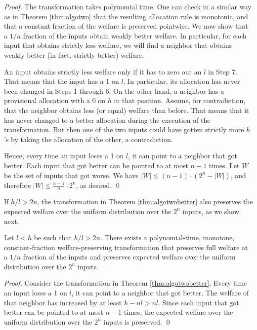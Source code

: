 \documentclass[runningheads,a4paper]{llncs}
\begin{document}
\begin{proof}
The transformation takes polynomial time. One can check in a similar way as in Theorem \ref{thm:algotwo} that the resulting allocation rule is monotonic, and that a constant fraction of the welfare is preserved pointwise. We now show that a $1/n$ fraction of the inputs obtain weakly better welfare. In particular, for each input that obtains strictly less welfare, we will find a neighbor that obtains weakly better (in fact, strictly better) welfare.

An input obtains strictly less welfare only if it has to zero out an $l$ in Step 7. That means that the input has a 1 on $l$. In particular, its allocation has never been changed in Steps 1 through 6. On the other hand, a neighbor has a provisional allocation with a 0 on $h$ in that position. Assume, for contradiction, that the neighbor obtains less (or equal) welfare than before. That means that it has never changed to a better allocation during the execution of the transformation. But then one of the two inputs could have gotten strictly more $h$'s by taking the allocation of the other, a contradiction.

Hence, every time an input loses a 1 on $l$, it can point to a neighbor that got better. Each input that got better can be pointed to at most $n-1$ times. Let $W$ be the set of inputs that got worse. We have $|W|\leq (n-1)\cdot(2^n-|W|)$, and therefore $|W|\leq\frac{n-1}{n}\cdot 2^n$, as desired. \qed
\end{proof}

If $h/l>2n$, the transformation in Theorem \ref{thm:algotwobetter} also preserves the expected welfare over the uniform distribution over the $2^n$ inputs, as we show next.

\begin{theorem}
\label{thm:algotwoexpected}
Let $l<h$ be such that $h/l>2n$. There exists a polynomial-time, monotone, constant-fraction welfare-preserving transformation that preserves full welfare at a $1/n$ fraction of the inputs and preserves expected welfare over the uniform distribution over the $2^n$ inputs.
\end{theorem}

\begin{proof}
Consider the transformation in Theorem \ref{thm:algotwobetter}. Every time an input loses a 1 on $l$, it can point to a neighbor that got better. The welfare of that neighbor has increased by at least $h-nl>nl$. Since each input that got better can be pointed to at most $n-1$ times, the expected welfare over the uniform distribution over the $2^n$ inputs is preserved. \qed
\end{proof}
\end{document}
